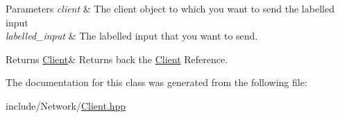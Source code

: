 \begin{DoxyParams}{Parameters}
{\em client} & The client object to which you want to send the labelled input \\
\hline
{\em labelled\+\_\+input} & The labelled input that you want to send. \\
\hline
\end{DoxyParams}
\begin{DoxyReturn}{Returns}
\hyperlink{classcp_1_1_client}{Client}\& Returns back the \hyperlink{classcp_1_1_client}{Client} Reference. 
\end{DoxyReturn}


The documentation for this class was generated from the following file\+:\begin{DoxyCompactItemize}
\item 
include/\+Network/\hyperlink{_client_8hpp}{Client.\+hpp}\end{DoxyCompactItemize}
